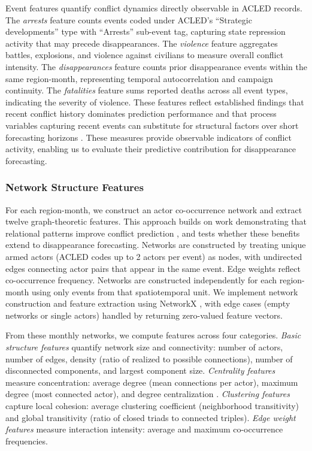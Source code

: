 \documentclass[pdflatex,sn-mathphys-num]{sn-jnl}%
\theoremstyle{thmstyleone}%
\theoremstyle{thmstyletwo}%
\theoremstyle{thmstylethree}%
\begin{document}
Event features quantify conflict dynamics directly observable in ACLED records. The \textit{arrests} feature counts events coded under ACLED's ``Strategic developments'' type with ``Arrests'' sub-event tag, capturing state repression activity that may precede disappearances. The \textit{violence} feature aggregates battles, explosions, and violence against civilians to measure overall conflict intensity. The \textit{disappearances} feature counts prior disappearance events within the same region-month, representing temporal autocorrelation and campaign continuity. The \textit{fatalities} feature sums reported deaths across all event types, indicating the severity of violence. These features reflect established findings that recent conflict history dominates prediction performance \cite{hegre2019views} and that process variables capturing recent events can substitute for structural factors over short forecasting horizons \cite{mueller2022hard}. These measures provide observable indicators of conflict activity, enabling us to evaluate their predictive contribution for disappearance forecasting.

\subsubsection{Network Structure Features}

For each region-month, we construct an actor co-occurrence network and extract twelve graph-theoretic features. This approach builds on work demonstrating that relational patterns improve conflict prediction \cite{dorff2020networks}, and tests whether these benefits extend to disappearance forecasting. Networks are constructed by treating unique armed actors (ACLED codes up to 2 actors per event) as nodes, with undirected edges connecting actor pairs that appear in the same event. Edge weights reflect co-occurrence frequency. Networks are constructed independently for each region-month using only events from that spatiotemporal unit. We implement network construction and feature extraction using NetworkX \cite{hagberg2007exploring}, with edge cases (empty networks or single actors) handled by returning zero-valued feature vectors.

From these monthly networks, we compute features across four categories. \textit{Basic structure features} quantify network size and connectivity: number of actors, number of edges, density (ratio of realized to possible connections), number of disconnected components, and largest component size. \textit{Centrality features} measure concentration: average degree (mean connections per actor), maximum degree (most connected actor), and degree centralization \cite{freeman1978centrality}. \textit{Clustering features} capture local cohesion: average clustering coefficient (neighborhood transitivity) and global transitivity (ratio of closed triads to connected triples). \textit{Edge weight features} measure interaction intensity: average and maximum co-occurrence frequencies.
\end{document}
